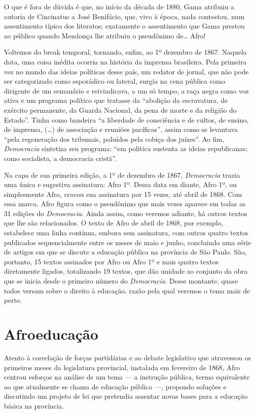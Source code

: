 O que é fora de dúvida é que, no início da década de 1880, Gama atribuiu
a autoria de Cincinatus a José Bonifácio, que, vivo à época, nada
contestou, num assentimento típico dos literatos; exatamente o
assentimento que Gama prestou ao público quando Mendonça lhe atribuiu o
pseudônimo de\ldots{} Afro!

Voltemos do break temporal, tornando, enfim, ao 1º dezembro de 1867.
Naquela data, uma coisa inédita ocorria na história da imprensa
brasileira. Pela primeira vez no mundo das ideias políticas desse país,
um redator de jornal, que não pode ser categorizado como esporádico ou
lateral, surgia na cena pública como dirigente de um semanário e
reivindicava, a um só tempo, a raça negra como voz ativa e um programa
político que tratasse da ``abolição da escravatura, de exército
permanente, da Guarda Nacional, da pena de morte e da religião do
Estado''. Tinha como bandeira ``a liberdade de consciência e de cultos, de
ensino, de imprensa, (\ldots{}) de associação e reuniões pacíficas'', assim
como se levantava ``pela regeneração dos tribunais, poluídos pela
cobiça dos juízes''. Ao fim, \emph{Democracia} sintetiza seu programa:
``em política sustenta as ideias republicanas; como socialista, a
democracia cristã''.

Na capa de sua primeira edição, a 1º de dezembro de 1867,
\emph{Democracia} trazia uma única e sugestiva assinatura: Afro 1º. Dessa data em diante, Afro 1º, ou simplesmente Afro,
cravou sua assinatura por 15 vezes, até abril de 1868. Com essa marca,
Afro figura como o pseudônimo que mais vezes aparece em todas as
31 edições do \emph{Democracia}. Ainda assim, como veremos adiante, há
outros textos que lhe são relacionados. O texto de Afro de abril
de 1868, por exemplo, estabelece uma linha contínua, embora sem
assinatura, com outros quatro textos publicados sequencialmente entre os
meses de maio e junho, concluindo uma série de artigos em que se discute
a educação pública na província de São Paulo. São, portanto, 15 textos
assinados por Afro ou Afro 1º e mais quatro textos
diretamente ligados, totalizando 19 textos, que dão unidade ao conjunto
da obra que se inicia desde o primeiro número do \emph{Democracia}.
Desse montante, quase todos versam sobre o direito à educação, razão
pela qual veremos o tema mais de perto.

\section{Afroeducação}

Atento à correlação de forças partidárias e ao debate legislativo que
atravessou os primeiros meses da legislatura provincial, instalada em
fevereiro de 1868, Afro centrou esforços na análise de um tema ---
a instrução pública, termo equivalente ao que atualmente se chama de
educação pública ---, propondo soluções e discutindo um projeto de lei
que pretendia assentar novas bases para a educação básica na província.

